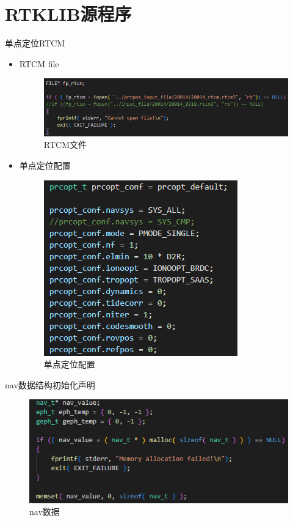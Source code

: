 \section{RTKLIB源程序}
\begin{frame}{单点定位RTCM}
    \begin{itemize}
        \item RTCM file
        \begin{figure}
            \centering
            \includegraphics[width=.5\textwidth]{pic/rtcm_file.png}
            \caption{RTCM文件}
            \label{fig:rtcm_file}
        \end{figure}
        \item 单点定位配置
        \begin{figure}
            \centering
            \includegraphics[width=.3\textwidth]{pic/prcopt_config.png}
            \caption{单点定位配置}
            \label{fig:pnt_config}
        \end{figure}
    \end{itemize}
\end{frame}

\begin{frame}{nav数据结构初始化声明}
    \begin{figure}
        \centering
        \includegraphics[width=.5\textwidth]{pic/nav_data_memset.png}
        \caption{nav数据}
        \label{fig:nav_data}
    \end{figure}
\end{frame}


